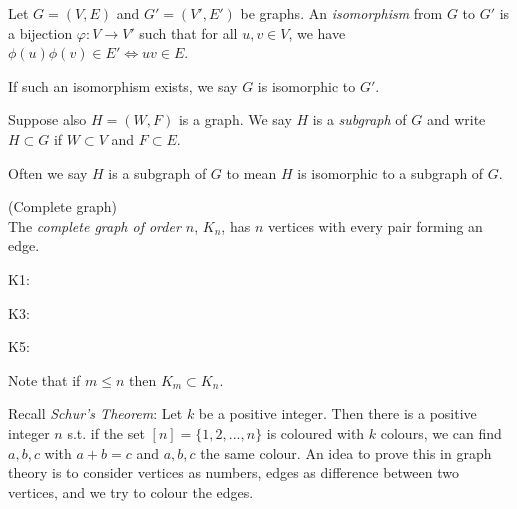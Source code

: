 \documentclass[a4paper]{article}
\begin{document}
\begin{defi}
Let $G=(V,E)$ and $G'=(V',E')$ be graphs. An \emph{isomorphism} from $G$ to $G'$ is a bijection $\varphi:V \to V'$ such that for all $u,v\in V$, we have $\phi(u)\phi(v) \in E' \iff uv \in E$.

If such an isomorphism exists, we say $G$ is isomorphic to $G'$.

Suppose also $H = (W,F)$ is a graph. We say $H$ is a \emph{subgraph} of $G$ and write $H \subset G$ if $W \subset V$ and $F \subset E$.

Often we say $H$ is a subgraph of $G$ to mean $H$ is isomorphic to a subgraph of $G$.
\end{defi}

\begin{eg} (Complete graph)\\
The \emph{complete graph of order $n$}, $K_n$, has $n$ vertices with every pair forming an edge.

K1:
\end{eg}

K3:

K5:

Note that if $m \leq n$ then $K_m \subset K_n$.

Recall \emph{Schur's Theorem}: Let $k$ be a positive integer. Then there is a positive integer $n$ s.t. if the set $[n] = \{1,2,...,n\}$ is coloured with $k$ colours, we can find $a,b,c$ with $a+b = c$ and $a,b,c$ the same colour. An idea to prove this in graph theory is to consider vertices as numbers, edges as difference between two vertices, and we try to colour the edges.
\end{document}
